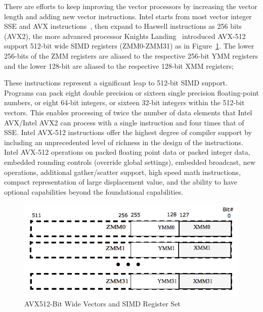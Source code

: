 \documentclass[sigconf]{acmart}
\begin{document}
There are efforts to keep improving the vector processors by increasing the vector
length and adding new vector instructions.
Intel starts from most vector integer SSE and AVX instructions~\cite{intel_sse, intel_avx, avxsets},
then expand to Haswell instructions as 256 bits (AVX2),
the more advanced processor Knights Landing~\cite{avx-info} introduced
AVX-512~\cite{Intelref} support 512-bit wide SIMD registers (ZMM0-ZMM31)
as in Figure~\ref{fig:avx_mms}. The lower 256-bits of the ZMM registers are
aliased to the respective 256-bit YMM registers and the lower 128-bit are
aliased to the respective 128-bit XMM registers;
%

These instructions represent a significant leap to 512-bit SIMD support. Programs
can pack eight double precision or sixteen single precision floating-point numbers,
or eight 64-bit integers, or sixteen 32-bit integers within the 512-bit vectors.
This enables processing of twice the number of data elements that Intel AVX/Intel
AVX2 can process with a single instruction and four times that of SSE.
%
Intel AVX-512 instructions offer the highest degree of compiler support by including
an unprecedented level of richness in the design of the instructions. Intel AVX-512
operations on packed floating point data or packed integer data, embedded
rounding controls (override global settings), embedded broadcast, new operations, additional
gather/scatter support, high speed math instructions, compact representation of
large displacement value, and the ability to have optional capabilities beyond
the foundational capabilities.

\begin{figure}[h]
    \centering
    \includegraphics[width=\linewidth]{avx_mms.png}
    \caption{AVX512-Bit Wide Vectors and SIMD Register Set}
    \label{fig:avx_mms}
\end{figure}
\end{document}
